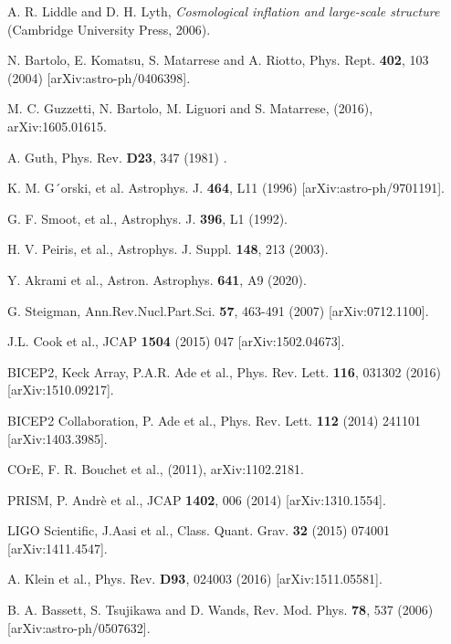\documentclass[11pt,a4paper,twoside]{book}
\begin{document}
\begin{thebibliography}{2}
	
	 A. R. Liddle and D. H. Lyth, \emph{Cosmological inflation and large-scale structure} (Cambridge University Press, 2006).
	
	 N. Bartolo, E. Komatsu, S. Matarrese and A. Riotto, Phys. Rept. \textbf{402}, 103 (2004) [arXiv:astro-ph/0406398].
	
	 M. C. Guzzetti, N. Bartolo, M. Liguori and S. Matarrese, (2016), arXiv:1605.01615. 
	
	 A. Guth, Phys. Rev. \textbf{D23}, 347 (1981) .
	
	 K. M. G´orski, et al. Astrophys. J. \textbf{464}, L11 (1996) [arXiv:astro-ph/9701191].
	
	 G. F. Smoot, et al., Astrophys. J. \textbf{396}, L1 (1992).

     H. V. Peiris, et al., Astrophys. J. Suppl. \textbf{148}, 213 (2003).
	
	 Y. Akrami et al., Astron. Astrophys. \textbf{641}, A9 (2020).
	
	 G. Steigman, Ann.Rev.Nucl.Part.Sci. \textbf{57}, 463-491 (2007) [arXiv:0712.1100].
	
	 J.L. Cook et al., JCAP \textbf{1504} (2015) 047 [arXiv:1502.04673].
	
	 BICEP2, Keck Array, P.A.R. Ade et al., Phys. Rev. Lett. \textbf{116}, 031302 (2016) [arXiv:1510.09217].
	
	 BICEP2 Collaboration, P. Ade et al., Phys. Rev. Lett. \textbf{112} (2014) 241101 [arXiv:1403.3985].
	
	 COrE, F. R. Bouchet et al., (2011), arXiv:1102.2181.  
	
	 PRISM, P. Andrè et al., JCAP \textbf{1402}, 006 (2014) [arXiv:1310.1554].
	
	 LIGO Scientific, J.Aasi et al., Class. Quant. Grav. \textbf{32} (2015) 074001 [arXiv:1411.4547].
	
	 A. Klein et al., Phys. Rev. \textbf{D93}, 024003 (2016) [arXiv:1511.05581].
	
	 B. A. Bassett, S. Tsujikawa and D. Wands, Rev. Mod. Phys. \textbf{78}, 537 (2006) [arXiv:astro-ph/0507632].
	

\end{thebibliography}
\end{document}
